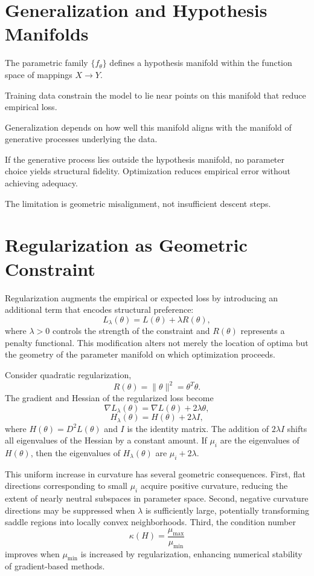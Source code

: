 \documentclass[12pt]{book}
\begin{document}
\section{Generalization and Hypothesis Manifolds}

The parametric family $\{f_\theta\}$ defines a hypothesis manifold within the function space of mappings $X \to Y$.

Training data constrain the model to lie near points on this manifold that reduce empirical loss.

Generalization depends on how well this manifold aligns with the manifold of generative processes underlying the data.

If the generative process lies outside the hypothesis manifold, no parameter choice yields structural fidelity. Optimization reduces empirical error without achieving adequacy.

The limitation is geometric misalignment, not insufficient descent steps.

\section{Regularization as Geometric Constraint}

Regularization augments the empirical or expected loss by introducing an additional term that encodes structural preference:
\[
L_\lambda(\theta)
=
L(\theta)
+
\lambda R(\theta),
\]
where $\lambda > 0$ controls the strength of the constraint and $R(\theta)$ represents a penalty functional. This modification alters not merely the location of optima but the geometry of the parameter manifold on which optimization proceeds.

Consider quadratic regularization,
\[
R(\theta) = \|\theta\|^2 = \theta^{T}\theta.
\]
The gradient and Hessian of the regularized loss become
\[
\nabla L_\lambda(\theta)
=
\nabla L(\theta)
+
2\lambda \theta,
\]
\[
H_\lambda(\theta)
=
H(\theta)
+
2\lambda I,
\]
where $H(\theta)=D^2L(\theta)$ and $I$ is the identity matrix. The addition of $2\lambda I$ shifts all eigenvalues of the Hessian by a constant amount. If $\mu_i$ are the eigenvalues of $H(\theta)$, then the eigenvalues of $H_\lambda(\theta)$ are $\mu_i + 2\lambda$.

This uniform increase in curvature has several geometric consequences. First, flat directions corresponding to small $\mu_i$ acquire positive curvature, reducing the extent of nearly neutral subspaces in parameter space. Second, negative curvature directions may be suppressed when $\lambda$ is sufficiently large, potentially transforming saddle regions into locally convex neighborhoods. Third, the condition number
\[
\kappa(H) = \frac{\mu_{\max}}{\mu_{\min}}
\]
improves when $\mu_{\min}$ is increased by regularization, enhancing numerical stability of gradient-based methods.
\end{document}
